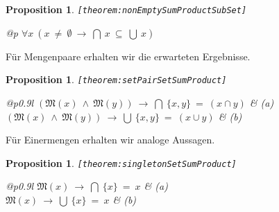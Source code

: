 \documentclass[a4paper,german,10pt,twoside]{book}
\newtheorem{prop}[thm]{Proposition}
\theoremstyle{definition}
\theoremstyle{remark}
\begin{document}
\begin{prop}
\label{theorem:nonEmptySumProductSubSet} \hypertarget{theorem:nonEmptySumProductSubSet}{}
{\tt \tiny [\verb]theorem:nonEmptySumProductSubSet]]}
\mbox{}
\begin{longtable}{{@{\extracolsep{\fill}}p{\linewidth}}}
\centering $\forall x\ (x \ \neq \ \emptyset\ \rightarrow\ \bigcap \ x \ \subseteq \ \bigcup \ x)$
\end{longtable}

\end{prop}


\par
F{\"u}r Mengenpaare erhalten wir die erwarteten Ergebnisse.

\begin{prop}
\label{theorem:setPairSetSumProduct} \hypertarget{theorem:setPairSetSumProduct}{}
{\tt \tiny [\verb]theorem:setPairSetSumProduct]]}
\mbox{}
\begin{longtable}{{@{\extracolsep{\fill}}p{0.9\linewidth}l}}
\centering $(\mathfrak{M}(x)\ \land\ \mathfrak{M}(y))\ \rightarrow\ \bigcap \ \{ x, y \} \ = \ (x \cap y)$ & \label{theorem:setPairSetSumProduct/a} \hypertarget{theorem:setPairSetSumProduct/a}{} \mbox{\emph{(a)}} \\
\centering $(\mathfrak{M}(x)\ \land\ \mathfrak{M}(y))\ \rightarrow\ \bigcup \ \{ x, y \} \ = \ (x \cup y)$ & \label{theorem:setPairSetSumProduct/b} \hypertarget{theorem:setPairSetSumProduct/b}{} \mbox{\emph{(b)}} 
\end{longtable}

\end{prop}


\par
F{\"u}r Einermengen erhalten wir analoge Aussagen.

\begin{prop}
\label{theorem:singletonSetSumProduct} \hypertarget{theorem:singletonSetSumProduct}{}
{\tt \tiny [\verb]theorem:singletonSetSumProduct]]}
\mbox{}
\begin{longtable}{{@{\extracolsep{\fill}}p{0.9\linewidth}l}}
\centering $\mathfrak{M}(x)\ \rightarrow\ \bigcap \ \{ x \} \ = \ x$ & \label{theorem:singletonSetSumProduct/a} \hypertarget{theorem:singletonSetSumProduct/a}{} \mbox{\emph{(a)}} \\
\centering $\mathfrak{M}(x)\ \rightarrow\ \bigcup \ \{ x \} \ = \ x$ & \label{theorem:singletonSetSumProduct/b} \hypertarget{theorem:singletonSetSumProduct/b}{} \mbox{\emph{(b)}} 
\end{longtable}

\end{prop}
\end{document}

